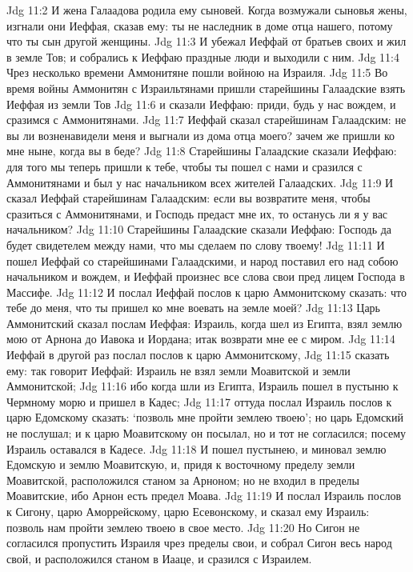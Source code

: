 Jdg 11:2  И жена Галаадова родила ему сыновей. Когда возмужали сыновья жены, изгнали они Иеффая, сказав ему: ты не наследник в доме отца нашего, потому что ты сын другой женщины.
Jdg 11:3  И убежал Иеффай от братьев своих и жил в земле Тов; и собрались к Иеффаю праздные люди и выходили с ним.
Jdg 11:4  Чрез несколько времени Аммонитяне пошли войною на Израиля.
Jdg 11:5  Во время войны Аммонитян с Израильтянами пришли старейшины Галаадские взять Иеффая из земли Тов
Jdg 11:6  и сказали Иеффаю: приди, будь у нас вождем, и сразимся с Аммонитянами.
Jdg 11:7  Иеффай сказал старейшинам Галаадским: не вы ли возненавидели меня и выгнали из дома отца моего? зачем же пришли ко мне ныне, когда вы в беде?
Jdg 11:8  Старейшины Галаадские сказали Иеффаю: для того мы теперь пришли к тебе, чтобы ты пошел с нами и сразился с Аммонитянами и был у нас начальником всех жителей Галаадских.
Jdg 11:9  И сказал Иеффай старейшинам Галаадским: если вы возвратите меня, чтобы сразиться с Аммонитянами, и Господь предаст мне их, то останусь ли я у вас начальником?
Jdg 11:10  Старейшины Галаадские сказали Иеффаю: Господь да будет свидетелем между нами, что мы сделаем по слову твоему!
Jdg 11:11  И пошел Иеффай со старейшинами Галаадскими, и народ поставил его над собою начальником и вождем, и Иеффай произнес все слова свои пред лицем Господа в Массифе.
Jdg 11:12  И послал Иеффай послов к царю Аммонитскому сказать: что тебе до меня, что ты пришел ко мне воевать на земле моей?
Jdg 11:13  Царь Аммонитский сказал послам Иеффая: Израиль, когда шел из Египта, взял землю мою от Арнона до Иавока и Иордана; итак возврати мне ее с миром.
Jdg 11:14  Иеффай в другой раз послал послов к царю Аммонитскому,
Jdg 11:15  сказать ему: так говорит Иеффай: Израиль не взял земли Моавитской и земли Аммонитской;
Jdg 11:16  ибо когда шли из Египта, Израиль пошел в пустыню к Чермному морю и пришел в Кадес;
Jdg 11:17  оттуда послал Израиль послов к царю Едомскому сказать: `позволь мне пройти землею твоею'; но царь Едомский не послушал; и к царю Моавитскому он посылал, но и тот не согласился; посему Израиль оставался в Кадесе.
Jdg 11:18  И пошел пустынею, и миновал землю Едомскую и землю Моавитскую, и, придя к восточному пределу земли Моавитской, расположился станом за Арноном; но не входил в пределы Моавитские, ибо Арнон есть предел Моава.
Jdg 11:19  И послал Израиль послов к Сигону, царю Аморрейскому, царю Есевонскому, и сказал ему Израиль: позволь нам пройти землею твоею в свое место.
Jdg 11:20  Но Сигон не согласился пропустить Израиля чрез пределы свои, и собрал Сигон весь народ свой, и расположился станом в Иааце, и сразился с Израилем.
